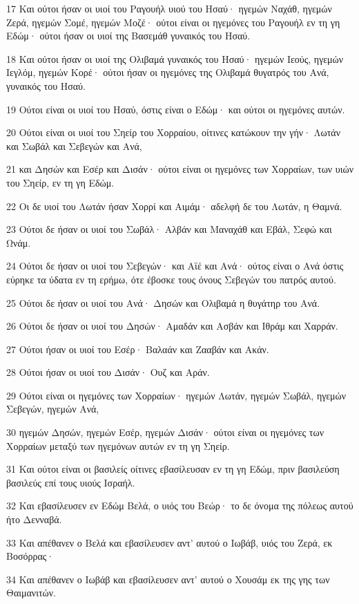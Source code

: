 \par 17 Και ούτοι ήσαν οι υιοί του Ραγουήλ υιού του Ησαύ· ηγεμών Ναχάθ, ηγεμών Ζερά, ηγεμών Σομέ, ηγεμών Μοζέ· ούτοι είναι οι ηγεμόνες του Ραγουήλ εν τη γη Εδώμ· ούτοι ήσαν οι υιοί της Βασεμάθ γυναικός του Ησαύ.
\par 18 Και ούτοι ήσαν οι υιοί της Ολιβαμά γυναικός του Ησαύ· ηγεμών Ιεούς, ηγεμών Ιεγλόμ, ηγεμών Κορέ· ούτοι ήσαν οι ηγεμόνες της Ολιβαμά θυγατρός του Ανά, γυναικός του Ησαύ.
\par 19 Ούτοι είναι οι υιοί του Ησαύ, όστις είναι ο Εδώμ· και ούτοι οι ηγεμόνες αυτών.
\par 20 Ούτοι είναι οι υιοί του Σηείρ του Χορραίου, οίτινες κατώκουν την γήν· Λωτάν και Σωβάλ και Σεβεγών και Ανά,
\par 21 και Δησών και Εσέρ και Δισάν· ούτοι είναι οι ηγεμόνες των Χορραίων, των υιών του Σηείρ, εν τη γη Εδώμ.
\par 22 Οι δε υιοί του Λωτάν ήσαν Χορρί και Αιμάμ· αδελφή δε του Λωτάν, η Θαμνά.
\par 23 Ούτοι δε ήσαν οι υιοί του Σωβάλ· Αλβάν και Μαναχάθ και Εβάλ, Σεφώ και Ωνάμ.
\par 24 Ούτοι δε ήσαν οι υιοί του Σεβεγών· και Αϊέ και Ανά· ούτος είναι ο Ανά όστις εύρηκε τα ύδατα εν τη ερήμω, ότε έβοσκε τους όνους Σεβεγών του πατρός αυτού.
\par 25 Ούτοι δε ήσαν οι υιοί του Ανά· Δησών και Ολιβαμά η θυγάτηρ του Ανά.
\par 26 Ούτοι δε ήσαν οι υιοί του Δησών· Αμαδάν και Ασβάν και Ιθράμ και Χαρράν.
\par 27 Ούτοι ήσαν οι υιοί του Εσέρ· Βαλαάν και Ζααβάν και Ακάν.
\par 28 Ούτοι ήσαν οι υιοί του Δισάν· Ουζ και Αράν.
\par 29 Ούτοι είναι οι ηγεμόνες των Χορραίων· ηγεμών Λωτάν, ηγεμών Σωβάλ, ηγεμών Σεβεγών, ηγεμών Ανά,
\par 30 ηγεμών Δησών, ηγεμών Εσέρ, ηγεμών Δισάν· ούτοι είναι οι ηγεμόνες των Χορραίων μεταξύ των ηγεμόνων αυτών εν τη γη Σηείρ.
\par 31 Και ούτοι είναι οι βασιλείς οίτινες εβασίλευσαν εν τη γη Εδώμ, πριν βασιλεύση βασιλεύς επί τους υιούς Ισραήλ.
\par 32 Και εβασίλευσεν εν Εδώμ Βελά, ο υιός του Βεώρ· το δε όνομα της πόλεως αυτού ήτο Δενναβά.
\par 33 Και απέθανεν ο Βελά και εβασίλευσεν αντ' αυτού ο Ιωβάβ, υιός του Ζερά, εκ Βοσόρρας·
\par 34 Και απέθανεν ο Ιωβάβ και εβασίλευσεν αντ' αυτού ο Χουσάμ εκ της γης των Θαιμανιτών.
